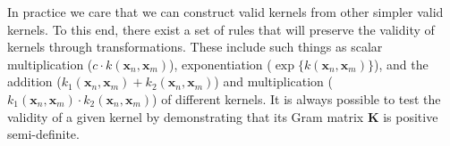 
In practice we care that we can construct valid kernels from other simpler valid kernels. To this end, there exist a set of rules that will preserve the validity of kernels through transformations. These include such things as scalar multiplication \big($c \cdot k(\textbf{x}_{n}, \textbf{x}_{m})$\big), exponentiation \big($\exp{\{k(\textbf{x}_{n}, \textbf{x}_{m})\}}$\big), and the addition \big($k_{1}(\textbf{x}_{n}, \textbf{x}_{m}) + k_{2}(\textbf{x}_{n}, \textbf{x}_{m})$\big) and multiplication \big($k_{1}(\textbf{x}_{n}, \textbf{x}_{m}) \cdot k_{2}(\textbf{x}_{n}, \textbf{x}_{m})$\big) of different kernels. It is always possible to test the validity of a given kernel by demonstrating that its Gram matrix $\textbf{K}$ is positive semi-definite.
